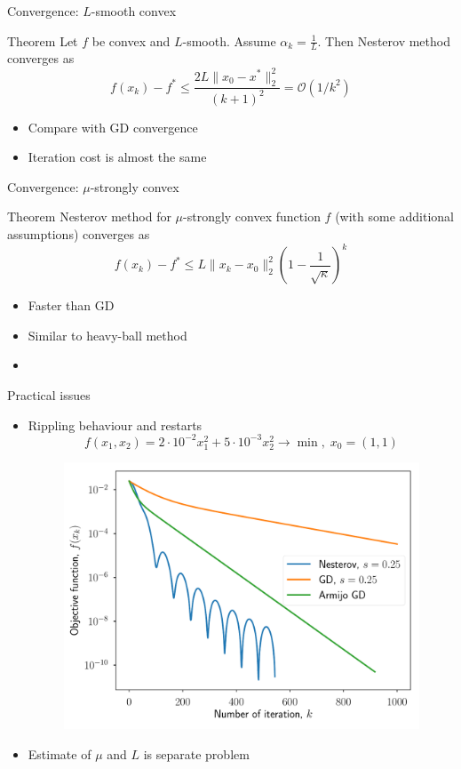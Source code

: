 \documentclass{beamer}
\begin{document}
\begin{frame}{Convergence: $L$-smooth convex}
\begin{block}{Theorem}
Let $f$ be convex and $L$-smooth. Assume $\alpha_k = \frac{1}{L}$. Then Nesterov method converges as
\[
f(x_k) - f^* \leq \frac{2L \|x_0 - x^*\|_2^2}{(k+1)^2} = \mathcal{O}(1/k^2)
\]
\end{block}
\begin{itemize}
\item Compare with GD convergence
\item Iteration cost is almost the same
\end{itemize}
\end{frame}

\begin{frame}{Convergence: $\mu$-strongly convex}
\begin{block}{Theorem}
Nesterov method for $\mu$-strongly convex function $f$ (with some additional assumptions) converges as 
\[
f(x_k) - f^* \leq L\|x_k - x_0\|_2^2 \left(1 - \frac{1}{\sqrt{\kappa}} \right)^k
\]
\end{block}

\begin{itemize}
\item Faster than GD
\item Similar to heavy-ball method
\item 
\end{itemize}
\end{frame}

\begin{frame}{Practical issues}
\begin{itemize}
\item Rippling behaviour and restarts
\[
f(x_1, x_2) = 2 \cdot 10^{-2}x_1^2 + 5 \cdot 10^{-3}x^2_2 \to \min, \; x_0 = (1, 1)
\]
\begin{figure}
\centering
\includegraphics[scale=0.4]{nesterov_gd}
\end{figure}
\item Estimate of $\mu$ and $L$ is separate problem
\end{itemize}
\end{frame}
\end{document}

